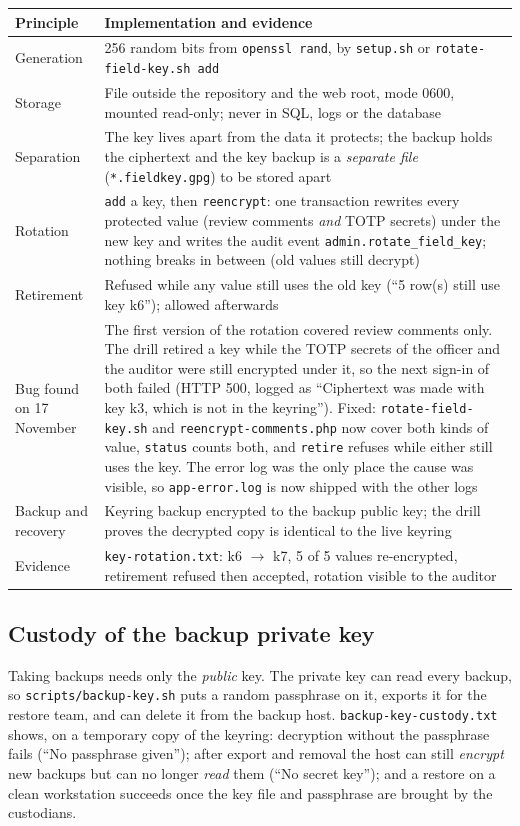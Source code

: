\documentclass[10pt,a4paper]{article}
\newcommand{\code}[1]{\nolinkurl{#1}}
\begin{document}
\begin{center}\small
\begin{tabularx}{\linewidth}{@{}L{2.6cm}Y@{}}
\toprule\textbf{Principle} & \textbf{Implementation and evidence}\\\midrule
Generation & 256 random bits from \code{openssl rand}, by \code{setup.sh} or \code{rotate-field-key.sh add}\\
Storage & File outside the repository and the web root, mode 0600, mounted read-only; never in SQL, logs or the database\\
Separation & The key lives apart from the data it protects; the backup holds the ciphertext and the key backup is a \emph{separate file} (\code{*.fieldkey.gpg}) to be stored apart\\
Rotation & \code{add} a key, then \code{reencrypt}: one transaction rewrites every protected value (review comments \emph{and} TOTP secrets) under the new key and writes the audit event \code{admin.rotate_field_key}; nothing breaks in between (old values still decrypt)\\
Retirement & Refused while any value still uses the old key (``5 row(s) still use key k6''); allowed afterwards\\
Bug found on 17 November & The first version of the rotation covered review comments only. The drill retired a key while the TOTP secrets of the officer and the auditor were still encrypted under it, so the next sign-in of both failed (HTTP 500, logged as ``Ciphertext was made with key k3, which is not in the keyring''). Fixed: \code{rotate-field-key.sh} and \code{reencrypt-comments.php} now cover both kinds of value, \code{status} counts both, and \code{retire} refuses while either still uses the key. The error log was the only place the cause was visible, so \code{app-error.log} is now shipped with the other logs\\
Backup and recovery & Keyring backup encrypted to the backup public key; the drill proves the decrypted copy is identical to the live keyring\\
Evidence & \code{key-rotation.txt}: k6 $\rightarrow$ k7, 5 of 5 values re-encrypted, retirement refused then accepted, rotation visible to the auditor\\
\bottomrule\end{tabularx}\end{center}


\subsection{Custody of the backup private key}
Taking backups needs only the \emph{public} key. The private key can read every backup, so \code{scripts/backup-key.sh} puts a random passphrase on it, exports it for the restore team, and can delete it from the backup host. \code{backup-key-custody.txt} shows, on a temporary copy of the keyring: decryption without the passphrase fails (``No passphrase given''); after export and removal the host can still \emph{encrypt} new backups but can no longer \emph{read} them (``No secret key''); and a restore on a clean workstation succeeds once the key file and passphrase are brought by the custodians.
\end{document}
